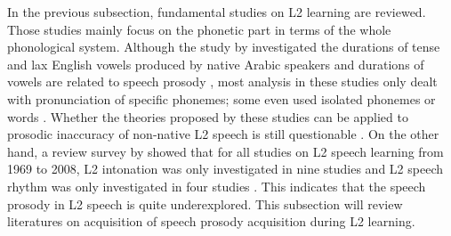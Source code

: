 In the previous subsection, fundamental studies on L2 learning are reviewed. Those studies mainly focus on the phonetic part in terms of the whole phonological system. Although the study by \cite{munro1993productions} investigated the durations of tense and lax English vowels produced by native Arabic speakers and durations of vowels are related to speech prosody \citep{ramus1999correlates}, most analysis in these studies only dealt with pronunciation of specific phonemes; some even used isolated phonemes or words \citep{flege1987production}. Whether the theories proposed by these studies can be applied to prosodic inaccuracy of non-native L2 speech is still questionable \citep{rasier2007prosodic}. On the other hand, a review survey by \cite{gut2009non} showed that for all studies on L2 speech learning from 1969 to 2008, L2 intonation was only investigated in nine studies and L2 speech rhythm was only investigated in four studies \citep{mennen2004bi,altmann2006perception,rasier2007prosodic,lin2008interlanguage}. This indicates that the speech prosody in L2 speech is quite underexplored. This subsection will review literatures on acquisition of speech prosody acquisition during L2 learning.

